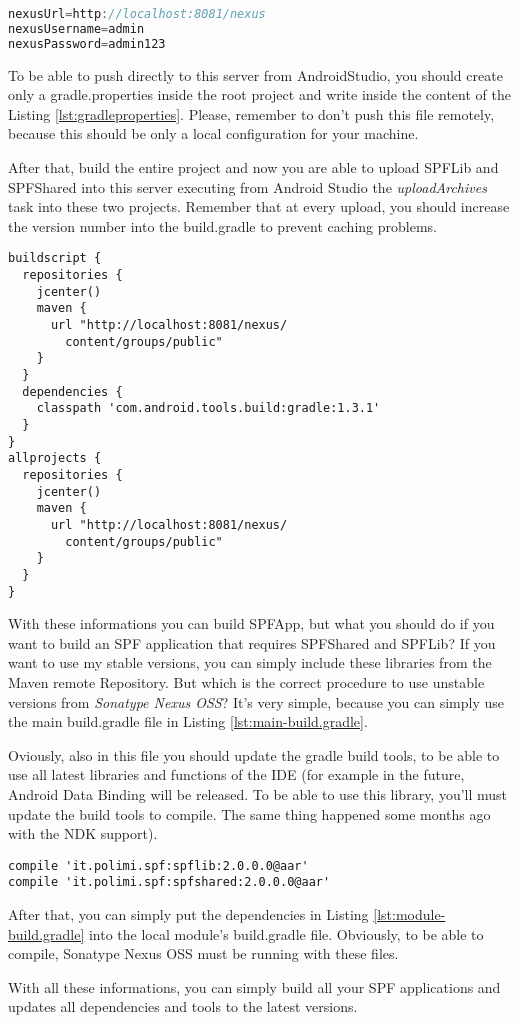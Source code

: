 \begin{lstlisting}[caption={gradle.properties},label=lst:gradleproperties, language=Java]
nexusUrl=http://localhost:8081/nexus
nexusUsername=admin
nexusPassword=admin123
\end{lstlisting}


To be able to push directly to this server from AndroidStudio, you should create only a \textsf{gradle.properties} inside the root project and write inside the content of the Listing \ref{lst:gradleproperties}. Please, remember to don't push this file remotely, because this should be only a local configuration for your machine.

After that, build the entire project and now you are able to upload \textsf{SPFLib} and \textsf{SPFShared} into this server executing from Android Studio the \emph{uploadArchives} task into these two projects. Remember that at every upload, you should increase the version number into the \textsf{build.gradle} to prevent caching problems.

\begin{lstlisting}[caption={Main build.gradle},label=lst:main-build.gradle]
buildscript {
  repositories {
    jcenter()
    maven {
      url "http://localhost:8081/nexus/
      	content/groups/public"
    }
  }
  dependencies {
    classpath 'com.android.tools.build:gradle:1.3.1'
  }
}
allprojects {
  repositories {
    jcenter()
    maven {
      url "http://localhost:8081/nexus/
		content/groups/public"
    }
  }
}
\end{lstlisting}

With these informations you can build \textsf{SPFApp}, but what you should do if you want to build an SPF application that requires \textsf{SPFShared} and \textsf{SPFLib}?
If you want to use my stable versions, you can simply include these libraries from the Maven remote Repository. But which is the correct procedure to use unstable versions from \emph{Sonatype Nexus OSS}?
It's very simple, because you can simply use the main \textsf{build.gradle} file in Listing \ref{lst:main-build.gradle}.

Oviously, also in this file you should update the gradle build tools, to be able to use all latest libraries and functions of the IDE (for example in the future, Android Data Binding will be released. To be able to use this library, you'll must update the build tools to compile. The same thing happened some months ago with the NDK support).

\begin{lstlisting}[caption={Module build.gradle's example},label=lst:module-build.gradle]
compile 'it.polimi.spf:spflib:2.0.0.0@aar'
compile 'it.polimi.spf:spfshared:2.0.0.0@aar'
\end{lstlisting}

After that, you can simply put the dependencies in Listing \ref{lst:module-build.gradle} into the local module's \textsf{build.gradle} file. Obviously, to be able to compile, Sonatype Nexus OSS must be running with these files. 

With all these informations, you can simply build all your SPF applications and updates all dependencies and tools to the latest versions.



